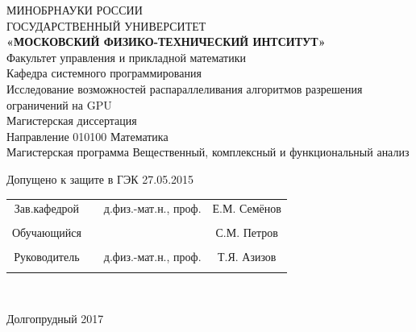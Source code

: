 \documentclass[a4paper,14pt,russian]{extreport}
\begin{document}
\begin{center}
\hfill \break
\large{МИНОБРНАУКИ РОССИИ}\\
\footnotesize{ГОСУДАРСТВЕННЫЙ УНИВЕРСИТЕТ}\\ 
\small{\textbf{«МОСКОВСКИЙ ФИЗИКО-ТЕХНИЧЕСКИЙ ИНТСИТУТ»}}\\
\hfill \break
\normalsize{Факультет управления и прикладной математики}\\
 \hfill \break
\normalsize{Кафедра системного программирования}\\
\hfill\break
\hfill \break
\hfill \break
\hfill \break
\large{Исследование возможностей распараллеливания алгоритмов разрешения ограничений на GPU}\\
\hfill \break
\hfill \break
\hfill \break
\normalsize{Магистерская диссертация\\
\hfill \break
Направление  010100 Математика\\
\hfill \break
Магистерская программа    Вещественный, комплексный и функциональный анализ}\\
\hfill \break
\hfill \break
\end{center}
 
\normalsize{ \hspace{28pt} Допущено к защите в ГЭК  27.05.2015} \hfill \break
\hfill \break
 
\normalsize{ 
\begin{tabular}{cccc}
Зав.кафедрой & \underline{\hspace{3cm}} &  д.физ.-мат.н.,  проф. & Е.М. Семёнов \\\\
Обучающийся & \underline{\hspace{3cm}} & &С.М. Петров \\\\
Руководитель & \underline{\hspace{3cm}}& д.физ.-мат.н., проф.&  Т.Я. Азизов \\\\
\end{tabular}
}\\
\hfill \break
\hfill \break
\begin{center} Долгопрудный 2017 \end{center}
\thispagestyle{empty} %
 
 
\newpage
     
    \tableofcontents %
\newpage
 
\end{document}
